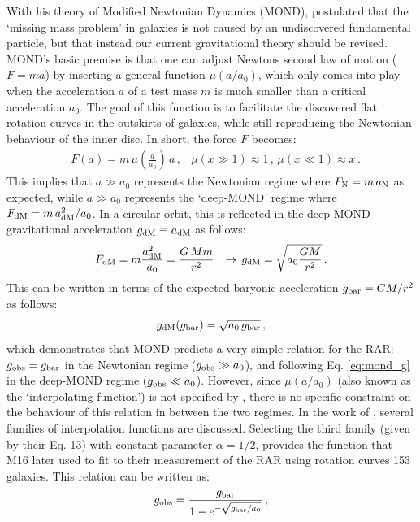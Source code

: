 \documentclass[usenatbib]{mnras}
\newcommand{\un}[1]{_{\rm #1}}
\begin{document}
With his theory of Modified Newtonian Dynamics (MOND), \cite{milgrom1983} postulated that the `missing mass problem' in galaxies is not caused by an undiscovered fundamental particle, but that instead our current gravitational theory should be revised. MOND's basic premise is that one can adjust Newtons second law of motion ($F=ma$) by inserting a general function $\mu(a/a_0)$, which only comes into play when the acceleration $a$ of a test mass $m$ is much smaller than a critical acceleration $a_0$. The goal of this function is to facilitate the discovered flat rotation curves in the outskirts of galaxies, while still reproducing the Newtonian behaviour of the inner disc. In short, the force $F$ becomes:
\begin{align}\label{eq:mond_f}
	& F(a) = m \, \mu(\frac{a}{a_0}) \, a \, ,
	& \mu(x \gg 1) \approx 1 \, , \, \mu(x \ll 1) \approx x \, .
\end{align}
This implies that $a\gg a_0$ represents the Newtonian regime where $F\un{N} = m \, a\un{N}$ as expected, while $a\gg a_0$ represents the `deep-MOND' regime where $F\un{dM}=m \, a\un{dM}^2/a_0$. In a circular orbit, this is reflected in the deep-MOND gravitational acceleration $g\un{dM} \equiv a\un{dM}$ as follows:
\begin{align}\label{eq:mond_g}
	& F\un{dM} = m \frac{a\un{dM}^2}{a_0} = \frac{G \, M m}{r^2}
	& \rightarrow \,  g\un{dM} = \sqrt{a_0 \frac{G M}{r^2}} \, .
\end{align}
This can be written in terms of the expected baryonic acceleration $g\un{bar}=GM/r^2$ as follows:
\begin{equation}
	g\un{dM}(g\un{bar}) = \sqrt{a_0 \, g\un{bar}} \, ,
\end{equation}
which demonstrates that MOND predicts a very simple relation for the RAR: $g\un{obs}=g\un{bar}$ in the Newtonian regime ($g\un{obs}\gg a_0$), and following Eq. \ref{eq:mond_g} in the deep-MOND regime ($g\un{obs}\ll a_0$). However, since $\mu(a/a_0)$ (also known as the `interpolating function') is not specified by \cite{milgrom1983}, there is no specific constraint on the behaviour of this relation in between the two regimes. In the work of \cite{milgrom2008}, several families of interpolation functions are discussed. Selecting the third family (given by their Eq. 13) with constant parameter $\alpha=1/2$, provides the function that M16 later used to fit to their measurement of the RAR using rotation curves 153 galaxies. This relation can be written as:
\begin{equation}\label{eq:rar_mcgaugh}
	g\un{obs} = \frac{g\un{bar}}{1 - e^{-\sqrt{g\un{bar}/a_0}}} \, ,
\end{equation}
\end{document}
